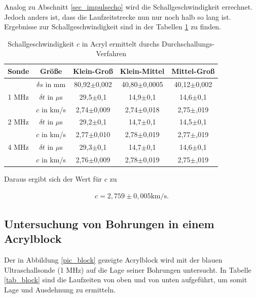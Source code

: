 Analog zu Abschnitt \ref{sec_impulsecho} wird die Schallgeschwindigkeit errechnet. Jedoch anders ist, dass die Laufzeitstrecke nun
nur noch halb so lang ist. Ergebnisse zur Schallgeschwindigkeit sind in der Tabellen
\ref{tab_schall_2} zu finden.
\renewcommand{\arraystretch}{1.5}
\begin{table}[H]
 \begin{tabular}{c|c|c|c|c}
Sonde & Größe & Klein-Groß & Klein-Mittel & Mittel-Groß\\
\hline
&$\delta s$ in mm	&	80,92$\pm$0,002&	40,80$\pm$0,0005&	40,12$\pm$0,002\\
\hline
\hline
1 MHz &$\delta t$ in $\mu$s &29,5$\pm$0,1&	14,9$\pm$0,1&	14,6$\pm$0,1\\
&$c$ in km/s		&2,74$\pm$0,009&	2,74$\pm$0,018	&	2,75$\pm$,019\\
\hline
2 MHz &$\delta t$ in $\mu$s &	29,2$\pm$0,1&	14,7$\pm$0,1&	14,5$\pm$0,1\\
&$c$ in km/s		&2,77$\pm$0,010&	2,78$\pm$0,019	&	2,77$\pm$,019\\
\hline
4 MHz &$\delta t$ in $\mu$s &	29,3$\pm$0,1&	14,7$\pm$0,1&	14,6$\pm$0,1\\
&$c$ in km/s		&2,76$\pm$0,009&	2,78$\pm$0,019	&	2,75$\pm$,019\\
 \end{tabular}
\caption{Schallgeschwindigkeit $c$ in Acryl ermittelt durchs Durchschallungs-Verfahren}
\label{tab_schall_2}
\end{table}
\renewcommand{\arraystretch}{1.0}
Daraus ergibt sich der Wert für $c$ zu

\begin{align}
 c = 2,759\pm0,005 \text{km/s}.
\end{align}



\subsection{Untersuchung von Bohrungen in einem Acrylblock}
\label{sec_bohrung}
Der in Abbildung \ref{pic_block} gezeigte Acrylblock wird mit der blauen Ultraschallsonde (1 MHz) auf die Lage seiner Bohrungen
untersucht. In Tabelle \ref{tab_block} sind die Laufzeiten von oben und von unten aufgeführt, um somit Lage und Ausdehnung zu
ermitteln.

